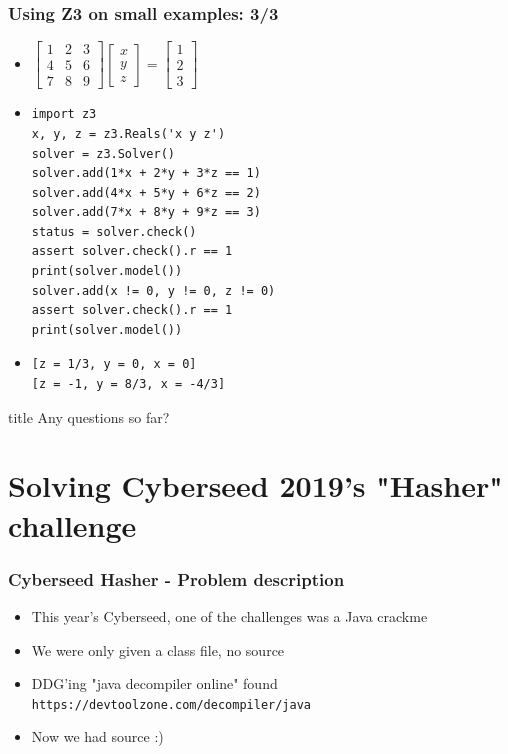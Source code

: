 \documentclass[aspectratio=169]{beamer}
\newcommand{\questionsslide}[1]{
  \begin{frame}
  \vfill
  \centering
  \begin{beamercolorbox}[sep=8pt,center,shadow=true,rounded=true]{title}
    \usebeamerfont{title}Any questions#1?\par%
  \end{beamercolorbox}
  \vfill
  \end{frame}
}
\begin{document}
\begin{frame}[fragile]
\frametitle{Using Z3 on small examples: 3/3}
\begin{itemize}
\item 
\(
\left[\begin{matrix}
1 & 2 & 3\\
4 & 5 & 6\\
7 & 8 & 9
\end{matrix}\right] 
\left[\begin{matrix}
x\\y\\z
\end{matrix}\right] 
 = \left[\begin{matrix}
1\\2\\3
\end{matrix}\right]
\)

\item \begin{Verbatim}[fontsize=\scriptsize, frame=single]
import z3
x, y, z = z3.Reals('x y z')
solver = z3.Solver()
solver.add(1*x + 2*y + 3*z == 1)
solver.add(4*x + 5*y + 6*z == 2)
solver.add(7*x + 8*y + 9*z == 3)
status = solver.check()
assert solver.check().r == 1
print(solver.model())
solver.add(x != 0, y != 0, z != 0)
assert solver.check().r == 1
print(solver.model())
\end{Verbatim}
\item \begin{Verbatim}[fontsize=\scriptsize, frame=single]
[z = 1/3, y = 0, x = 0]
[z = -1, y = 8/3, x = -4/3]
\end{Verbatim}
\end{itemize}
\end{frame}

\questionsslide{ so far}
\section{Solving Cyberseed 2019's "Hasher" challenge}

\begin{frame}[fragile]
\frametitle{Cyberseed Hasher - Problem description}
\begin{itemize}
\item This year's Cyberseed, one of the challenges was a Java crackme
\item We were only given a class file, no source
\item DDG'ing "java decompiler online" found \verb|https://devtoolzone.com/decompiler/java|
\item Now we had source :)
\end{itemize}
\end{frame}
\end{document}
